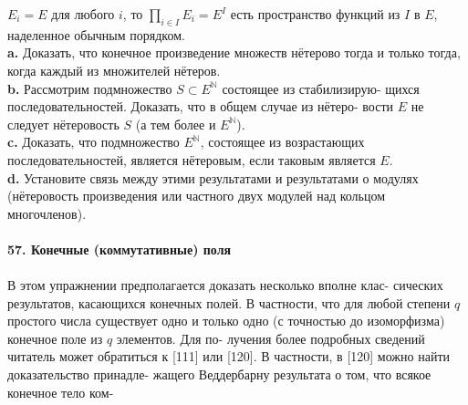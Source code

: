 \noindent $E_i=E$ для любого $i$, то $\prod_{i\in I} E_i=E^I$ есть пространство функций из $I$\linebreak
в $E$, наделенное обычным порядком.\\
\hspace*{10pt}\textbf{a.} Доказать, что конечное произведение множеств нётерово тогда\linebreak
и только тогда, когда каждый из множителей нётеров.\\
\hspace*{10pt}\textbf{b.} Рассмотрим подмножество $S \subset E^\mathbb{N}$ состоящее из стабилизирую-\linebreak
щихся последовательностей. Доказать, что в общем случае из нётеро-\linebreak
вости $E$ не следует нётеровость $S$ (а тем более и $E^\mathbb{N}$).
\\
\hspace*{10pt}\textbf{c.} Доказать, что подмножество  $E^\mathbb{N}$, состоящее из возрастающих\linebreak
последовательностей, является нётеровым, если таковым является $E$.
\\
\hspace*{10pt}\textbf{d.} Установите связь между этими результатами и результатами\linebreak
о модулях (нётеровость произведения или частного двух модулей над\linebreak
кольцом многочленов).
\\
\\
\noindent\textbf{57. Конечные (коммутативные) поля}\\\\
\hspace*{10pt} В этом упражнении предполагается доказать несколько вполне клас-\linebreak
сических результатов, касающихся конечных полей. В частности, что\linebreak
для любой степени $q$ простого числа существует одно и только одно\linebreak
(с точностью до изоморфизма) конечное поле из $q$ элементов. Для по-\linebreak
лучения более подробных сведений читатель может обратиться к [111]\linebreak
или [120]. В частности, в [120] можно найти доказательство принадле-\linebreak
жащего Веддербарну результата о том, что всякое конечное тело ком-\linebreak
